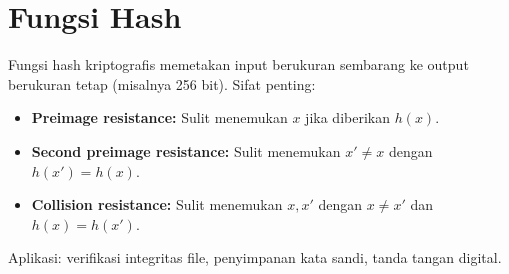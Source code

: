 \section{Fungsi Hash}

Fungsi hash kriptografis memetakan input berukuran sembarang ke output berukuran tetap (misalnya 256 bit). Sifat penting:

\begin{itemize}
\item \textbf{Preimage resistance:} Sulit menemukan $x$ jika diberikan $h(x)$.
\item \textbf{Second preimage resistance:} Sulit menemukan $x' \neq x$ dengan $h(x') = h(x)$.
\item \textbf{Collision resistance:} Sulit menemukan $x, x'$ dengan $x \neq x'$ dan $h(x) = h(x')$.
\end{itemize}

Aplikasi: verifikasi integritas file, penyimpanan kata sandi, tanda tangan digital.
